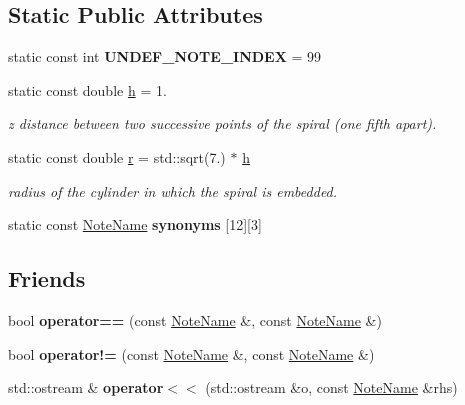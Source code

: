 \subsection*{Static Public Attributes}
\begin{DoxyCompactItemize}
\item 
static const int {\bfseries U\+N\+D\+E\+F\+\_\+\+N\+O\+T\+E\+\_\+\+I\+N\+D\+EX} = 99
\item 
static const double \mbox{\hyperlink{group__segment_ga51da52124dc1108e143b2a9f73537ada}{h}} = 1.
\begin{DoxyCompactList}\small\item\em z distance between two successive points of the spiral (one fifth apart). \end{DoxyCompactList}\item 
static const double \mbox{\hyperlink{group__segment_ga814ef312c571ae51a0007c1d5a6a0b17}{r}} = std\+::sqrt(7.) $\ast$ \mbox{\hyperlink{group__segment_ga51da52124dc1108e143b2a9f73537ada}{h}}
\begin{DoxyCompactList}\small\item\em radius of the cylinder in which the spiral is embedded. \end{DoxyCompactList}\item 
static const \mbox{\hyperlink{structNoteName}{Note\+Name}} {\bfseries synonyms} \mbox{[}12\mbox{]}\mbox{[}3\mbox{]}
\end{DoxyCompactItemize}
\subsection*{Friends}
\begin{DoxyCompactItemize}
\item 
\mbox{\label{structNoteName_a5562caeaa220ead5487a286a7765b00f}} 
bool {\bfseries operator==} (const \mbox{\hyperlink{structNoteName}{Note\+Name}} \&, const \mbox{\hyperlink{structNoteName}{Note\+Name}} \&)
\item 
\mbox{\label{structNoteName_aebe4abfae4e6f512246bf067c0d122f4}} 
bool {\bfseries operator!=} (const \mbox{\hyperlink{structNoteName}{Note\+Name}} \&, const \mbox{\hyperlink{structNoteName}{Note\+Name}} \&)
\item 
\mbox{\label{structNoteName_af173a8baf0712bebb0c55fd0b1f225a0}} 
std\+::ostream \& {\bfseries operator$<$$<$} (std\+::ostream \&o, const \mbox{\hyperlink{structNoteName}{Note\+Name}} \&rhs)
\end{DoxyCompactItemize}



